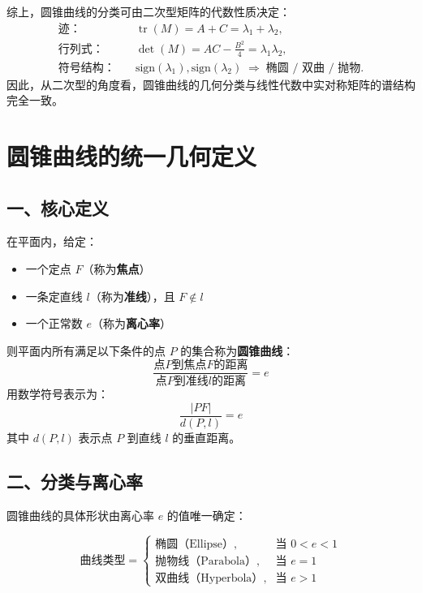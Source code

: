 \documentclass{ctexart}
\begin{document}
综上，圆锥曲线的分类可由二次型矩阵的代数性质决定：
\[
\boxed{
	\begin{aligned}
		\text{迹：}&\quad \operatorname{tr}(M) = A + C = \lambda_1 + \lambda_2, \\
		\text{行列式：}&\quad \det(M) = AC - \tfrac{B^2}{4} = \lambda_1 \lambda_2, \\
		\text{符号结构：}&\quad \text{sign}(\lambda_1),\text{sign}(\lambda_2)
		\;\Rightarrow\;
		\text{椭圆 / 双曲 / 抛物}.
	\end{aligned}
}
\]
因此，从二次型的角度看，圆锥曲线的几何分类与线性代数中实对称矩阵的谱结构完全一致。


	\section*{圆锥曲线的统一几何定义}
	
	\subsection*{一、核心定义}
	
	在平面内，给定：
	\begin{itemize}
		\item 一个定点 \( F \)（称为\textbf{焦点}）
		\item 一条定直线 \( l \)（称为\textbf{准线}），且 \( F \notin l \)
		\item 一个正常数 \( e \)（称为\textbf{离心率}）
	\end{itemize}
	
	则平面内所有满足以下条件的点 \( P \) 的集合称为\textbf{圆锥曲线}：
	\[
	\frac{\text{点}P\text{到焦点}F\text{的距离}}{\text{点}P\text{到准线}l\text{的距离}} = e
	\]
	用数学符号表示为：
	\[
	\frac{|PF|}{d(P, l)} = e
	\]
	其中 \( d(P, l) \) 表示点 \( P \) 到直线 \( l \) 的垂直距离。
	
	\subsection*{二、分类与离心率}
	
	圆锥曲线的具体形状由离心率 \( e \) 的值唯一确定：
	
	\[
	\text{曲线类型} =
	\begin{cases}
		\text{椭圆（Ellipse）}, & \text{当 } 0 < e < 1 \\
		\text{抛物线（Parabola）}, & \text{当 } e = 1 \\
		\text{双曲线（Hyperbola）}, & \text{当 } e > 1
	\end{cases}
	\]
	
\end{document}
